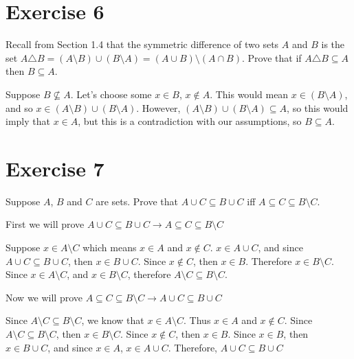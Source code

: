 \documentclass[11pt]{article}
\newcommand{\then}{\rightarrow}
\begin{document}
\section*{Exercise 6}

Recall from Section 1.4 that the symmetric difference of two sets $A$ and $B$ is 
the set $A \triangle B = (A \setminus B) \cup (B \setminus A) = 
(A \cup B) \setminus (A \cap B)$. Prove that if $A \triangle B \subseteq A$ then 
$B \subseteq A$.

Suppose $B \nsubseteq A$. Let's choose some $x \in B$, $x \notin A$. This would 
mean $x \in (B \setminus A)$, and so $x \in (A \setminus B) \cup (B \setminus A)$.
However, $(A \setminus B) \cup (B \setminus A) \subseteq A$, so this would imply 
that $x \in A$, but this is a contradiction with our assumptions, so 
$B \subseteq A$.

\section*{Exercise 7}

Suppose $A$, $B$ and $C$ are sets. Prove that $A \cup C \subseteq B \cup C$ iff 
$A \subseteq C \subseteq B \setminus C$.

First we will prove $A \cup C \subseteq B \cup C \then A \subseteq C \subseteq B \setminus C$

Suppose $x \in A \setminus C$ which means $x \in A$ and $x \notin C$. $x \in A \cup C$,
and since $A \cup C \subseteq B \cup C$, then $x \in B \cup C$. Since $x \notin C$, then 
$x \in B$. Therefore $x \in B \setminus C$. Since $x \in A \setminus C$, and 
$x \in B \setminus C$, therefore $A \setminus C \subseteq B \setminus C$.

Now we will prove $A \subseteq C \subseteq B \setminus C \then A \cup C \subseteq B \cup C$

Since $A \setminus C \subseteq B \setminus C$, we know that $x \in A \setminus C$.
Thus $x \in A$ and $x \notin C$. Since $A \setminus C \subseteq B \setminus C$, then 
$x \in B \setminus C$. Since $x \notin C$, then $x \in B$. Since $x \in B$, then 
$x \in B \cup C$, and since $x \in A$, $x \in A \cup C$. 
Therefore, $A \cup C \subseteq B \cup C$
\end{document}
